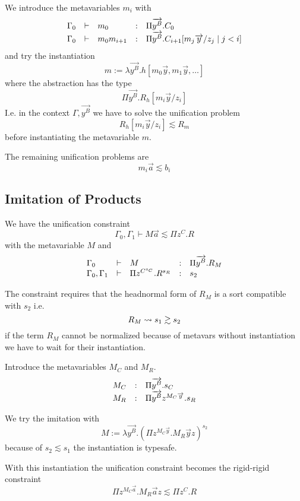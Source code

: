 We introduce the metavariables $m_i$ with
$$
\begin{array}{lllll} 
    \Gamma_0 &\vdash&
    m_0
    &:&
    \Pi {\overrightarrow {y^B}}. C_0
    \\
    \Gamma_0 &\vdash&
    m_0
    m_{i + 1}
    &:&
    \Pi {\overrightarrow {y^B}}. C_{i + 1}[m_j {\overrightarrow {y}} / z_j \mid j < i]
 \end{array}
$$
and try the instantiation
$$
    m := \lambda \vec{y^B}. h [m_0 \vec y, m_1 \vec y, \ldots]
$$
where the abstraction has the type
$$
    \Pi \vec{y^B}. R_h[m_i \vec y / z_i]
$$
I.e. in the context $\Gamma, \vec{y^B}$ we have to solve the unification problem
$$
    R_h[m_i \vec y / z_i] \lesssim R_m
$$
before instantiating the metavariable $m$.

The remaining unification problems are
$$
    m_i \vec a \lesssim b_i
$$








\subsection{Imitation of Products}

We have the unification constraint
$$
    \Gamma_0, \Gamma_1 \vdash M \vec a \lesssim \Pi z^C. R
$$
with the metavariable $M$ and
$$
\begin{array}{lllll} 
    \Gamma_0
    &\vdash&
    M
    &:&
    \Pi {\overrightarrow {y^B}}. R_M
    \\
    \Gamma_0, \Gamma_1
    &\vdash&
    \Pi z^{C^{s_C}}. R^{s_R}
    &:&
    s_2
 \end{array}
$$

The constraint requires that the headnormal form of $R_M$ is a sort compatible
with $s_2$ i.e.
$$
    R_M \leadsto s_1 \gtrsim s_2
$$
if the term $R_M$ cannot be normalized because of metavars without instantiation
we have to wait for their instantiation.


Introduce the metavariables $M_C$ and $M_R$.
$$
\begin{array}{lllll} 
    M_C
    &:&
    \Pi {\overrightarrow {y^B}}. s_C
    \\
    M_R
    &:&
    \Pi {\overrightarrow {y^B}} z^{M_C {\overrightarrow {y}}}. s_R
 \end{array}
$$

We try the imitation with
$$
    M := \lambda \vec {y^B}. (\Pi z^{M_C \vec y}. M_R \vec y z)^{s_2}
$$
because of $s_2 \lesssim s_1$ the instantiation is typesafe.

With this instantiation the unification constraint becomes the rigid-rigid
constraint
$$
    \Pi z^{M_C \vec a}. M_R \vec a z
    \lesssim
    \Pi z^C. R
$$







